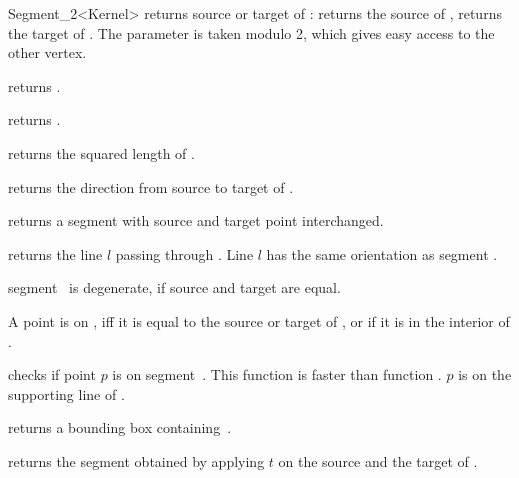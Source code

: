 \begin{ccRefClass} {Segment_2<Kernel>}
       {returns source or target   of \ccVar:    returns
        the source of \ccVar,  returns the target of \ccVar. 
        The parameter  is taken modulo 2, which gives 
        easy access to the other vertex. }

	{returns .}

       {returns .}

       {returns the squared length of \ccVar. }

       {returns the direction from source to target of \ccVar.}


       {returns a segment with source and target point interchanged.}

       {returns the line $l$ passing through \ccVar. Line $l$  has the
        same orientation as segment \ccVar.}

\ccPredicates

       {segment \ccVar\ is degenerate, if source and target are equal.}

       {}
\ccGlue
{}
       {}

       {A point is on \ccVar, iff it is equal to the source or target 
        of \ccVar, or if it is in the interior of \ccVar.}

       {checks if point $p$ is on segment~\ccVar. This function is faster
        than function .
        \ccPrecond $p$ is on the supporting line of \ccVar.}


       {returns a bounding box containing~\ccVar.}

       {returns the segment obtained by applying $t$ on the source
        and the target of \ccVar.}

\ccSeeAlso
{}\\

\end{ccRefClass} 
